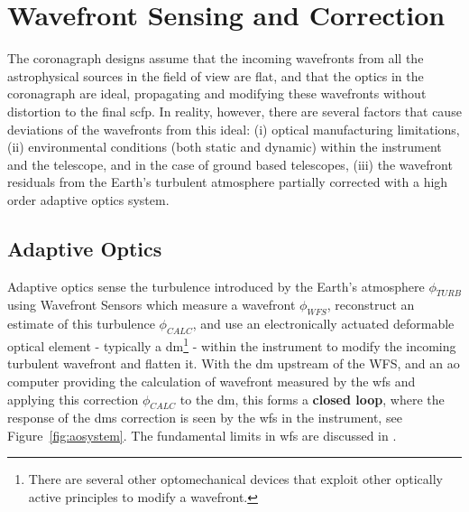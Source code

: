 \documentclass[letterpaper]{ar-1col}
\newcommand{\acc}[1]{\entry{\acs{#1}}{\acl{#1}}}
\begin{document}
\section{Wavefront Sensing and Correction}

The coronagraph designs assume that the incoming wavefronts from all the astrophysical sources in the field of view are flat, and that the optics in the coronagraph are ideal, propagating and modifying these wavefronts without distortion to the final \ac{scfp}.
%
In reality, however, there are several factors that cause deviations of the wavefronts from this ideal: (i) optical manufacturing limitations, (ii) environmental conditions (both static and dynamic) within the instrument and the telescope, and in the case of ground based telescopes, (iii) the wavefront residuals from the Earth's turbulent atmosphere partially corrected with a high order adaptive optics system.

\subsection{Adaptive Optics}

Adaptive optics sense the turbulence introduced by the Earth's atmosphere $\phi_{TURB}$ using Wavefront Sensors which measure a wavefront $\phi_{WFS}$, reconstruct an estimate of this turbulence $\phi_{CALC}$, and use an electronically actuated deformable optical element - typically a \ac{dm}\footnote{There are several other optomechanical devices that exploit other optically active principles to modify a wavefront.} - within the instrument to modify the incoming turbulent wavefront and flatten it.
%
With the \ac{dm} upstream of the WFS, and an \ac{ao} computer providing the calculation of wavefront measured by the \ac{wfs} and applying this correction $\phi_{CALC}$ to the \ac{dm}, this forms a {\bf closed loop}, where the response of the \acp{dm} correction is seen by the \ac{wfs} in the instrument, see Figure~\ref{fig:aosystem}.
%
The fundamental limits in \ac{wfs} are discussed in .

%
\begin{armarginnote}[]
\acc{dm}
\acc{fpm}
\acc{ppm}
\acc{wfs}
\acc{ao}
\end{armarginnote}
\end{document}
